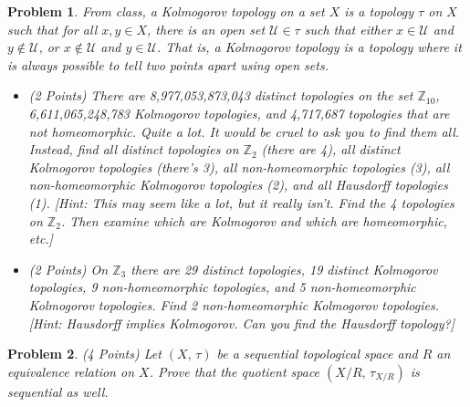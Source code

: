 \documentclass{article}
\theoremstyle{normal}
\newtheorem{problem}{Problem}
\begin{document}
    \begin{problem}
        From class, a Kolmogorov topology on a set $X$ is a topology
        $\tau$ on $X$ such that for all $x,y\in{X}$, there is an open set
        $\mathcal{U}\in\tau$ such that either $x\in\mathcal{U}$ and
        $y\notin\mathcal{U}$, or $x\notin\mathcal{U}$ and $y\in\mathcal{U}$.
        That is, a Kolmogorov topology is a topology where it is always possible
        to tell two points apart using open sets.
        \begin{itemize}
            \item (2 Points)
                There are 8,977,053,873,043 distinct topologies on the set
                $\mathbb{Z}_{10}$, 6,611,065,248,783 Kolmogorov topologies,
                and 4,717,687 topologies that are not homeomorphic. Quite a lot.
                It would be cruel to ask you to find them all. Instead, find all
                distinct topologies on $\mathbb{Z}_{2}$ (there are 4), all
                distinct Kolmogorov topologies (there's 3), all non-homeomorphic
                topologies (3), all non-homeomorphic Kolmogorov topologies
                (2), and all Hausdorff topologies (1). [Hint: This may seem
                like a lot, but it really isn't. Find the 4 topologies on
                $\mathbb{Z}_{2}$. Then examine which are Kolmogorov and which
                are homeomorphic, etc.]
            \item (2 Points)
                On $\mathbb{Z}_{3}$ there are 29 distinct topologies, 19
                distinct Kolmogorov topologies, 9 non-homeomorphic topologies,
                and 5 non-homeomorphic Kolmogorov topologies. Find 2
                non-homeomorphic Kolmogorov topologies.
                [Hint: Hausdorff implies Kolmogorov. Can you find the
                Hausdorff topology?]
        \end{itemize}
    \end{problem}
    \begin{problem}
        (4 Points) Let $(X,\,\tau)$ be a sequential topological space and $R$ an
        equivalence relation on $X$. Prove that the quotient space
        $(X/R,\,\tau_{X/R})$ is sequential as well.
    \end{problem}
\end{document}
